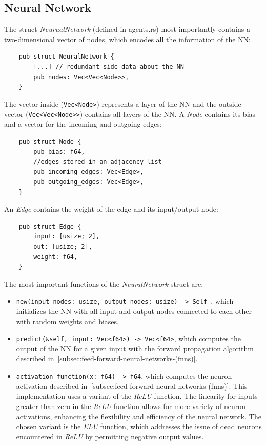 \documentclass[11pt]{report}
\begin{document}
\begin{enumerate}
    \subsection{Neural Network}\label{subsec:neural-network}
    The struct \textit{NeurualNetwork} (defined in agents.rs) most importantly contains a two-dimensional vector of nodes, which encodes all the information of the NN\@:
    \begin{verbatim}
    pub struct NeuralNetwork {
        [...] // redundant side data about the NN
        pub nodes: Vec<Vec<Node>>,
    }
    \end{verbatim}
    The vector inside (\texttt{Vec<Node>}) represents a layer of the NN and the outside vector (\texttt{Vec<Vec<Node>>}) contains all layers of the NN\@.
    A \textit{Node} contains its bias and a vector for the incoming and outgoing edges:
    \begin{verbatim}
    pub struct Node {
        pub bias: f64,
        //edges stored in an adjacency list
        pub incoming_edges: Vec<Edge>,
        pub outgoing_edges: Vec<Edge>,
    }
    \end{verbatim}
    An \textit{Edge} contains the weight of the edge and its input/output node:
    \begin{verbatim}
    pub struct Edge {
        input: [usize; 2],
        out: [usize; 2],
        weight: f64,
    }
    \end{verbatim}
    The most important functions of the \textit{NeuralNetwork} struct are:
    \begin{itemize}
        \item \texttt{new(input_nodes: usize, output_nodes: usize) -> Self {}}, which initializes the NN with all input and output nodes connected to each other with random weights and biases.
        \item \texttt{predict(&self, input: Vec<f64>) -> Vec<f64>}, which computes the output of the NN for a given input with the forward propagation algorithm described in~\ref{subsec:feed-forward-neural-networks-(fnns)}.
        \item \texttt{activation_function(x: f64) -> f64}, which computes the neuron activation described in~\ref{subsec:feed-forward-neural-networks-(fnns)}.
        This implementation uses a variant of the \textit{ReLU} function.
        The linearity for inputs greater than zero in the \textit{ReLU} function allows for more variety of neuron activations, enhancing the flexibility and efficiency of the neural network.
        The chosen variant is the \textit{ELU} function, which addresses the issue of dead neurons encountered in \textit{ReLU} by permitting negative output values.
    \end{itemize}


\end{enumerate}
\end{document}
